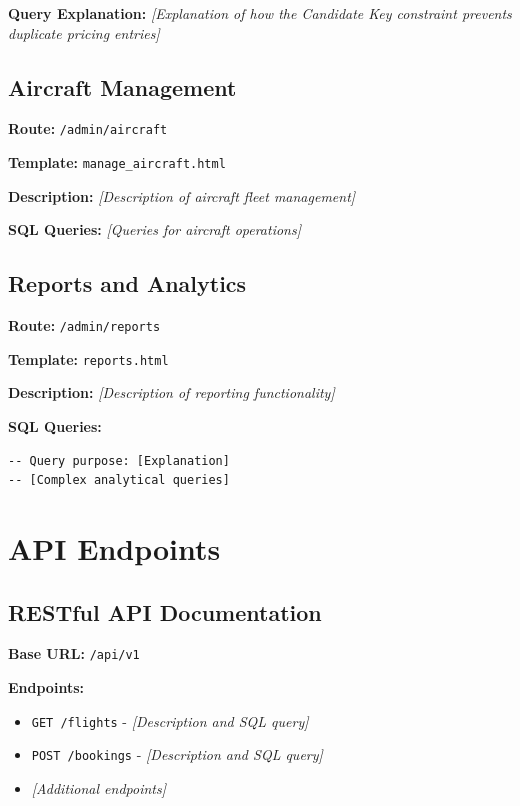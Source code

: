 \documentclass[12pt,a4paper,openany]{report}
\begin{document}
\textbf{Query Explanation:}
\textit{[Explanation of how the Candidate Key constraint prevents duplicate pricing entries]}

\subsection{Aircraft Management}

\textbf{Route:} \texttt{/admin/aircraft}

\textbf{Template:} \texttt{manage\_aircraft.html}

\textbf{Description:}
\textit{[Description of aircraft fleet management]}

\textbf{SQL Queries:}
\textit{[Queries for aircraft operations]}

\subsection{Reports and Analytics}

\textbf{Route:} \texttt{/admin/reports}

\textbf{Template:} \texttt{reports.html}

\textbf{Description:}
\textit{[Description of reporting functionality]}

\textbf{SQL Queries:}

\begin{lstlisting}[caption={Revenue Report Query}]
-- Query purpose: [Explanation]
-- [Complex analytical queries]
\end{lstlisting}

\section{API Endpoints}

\subsection{RESTful API Documentation}

\textbf{Base URL:} \texttt{/api/v1}

\textbf{Endpoints:}
\begin{itemize}
    \item \texttt{GET /flights} - \textit{[Description and SQL query]}
    \item \texttt{POST /bookings} - \textit{[Description and SQL query]}
    \item \textit{[Additional endpoints]}
\end{itemize}
\end{document}
